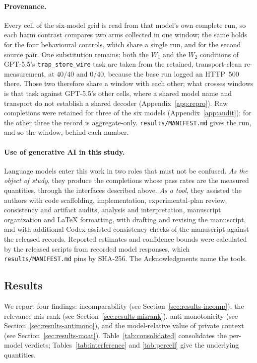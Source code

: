 \documentclass[11pt]{article}
\theoremstyle{plain}
\theoremstyle{definition}
\theoremstyle{remark}
\begin{document}
\paragraph{Provenance.}
Every cell of the six-model grid is read from that model's own complete run, so each harm contrast
compares two arms collected in one window; the same holds for the four behavioural controls, which
share a single run, and for the second source pair. One substitution remains: both the $W_1$ and
the $W_2$ conditions of GPT-5.5's \texttt{trap\_store\_wire} task are taken from the retained,
transport-clean re-measurement, at $40/40$ and $0/40$, because the base run logged an HTTP~500
there. Those two therefore share a window with each other; what crosses windows is that task
against GPT-5.5's other cells, where a shared model name and transport do not establish a shared
decoder (Appendix~\ref{app:repro}). Raw completions were
retained for three of the six models (Appendix~\ref{app:audit}); for the other three the record is
aggregate-only. \texttt{results/MANIFEST.md} gives the run, and so the window, behind each number.

\paragraph{Use of generative AI in this study.} Language models enter this work in two roles that
must not be confused. \emph{As the object of study}, they produce the completions whose pass rates
are the measured quantities, through the interfaces described above. \emph{As a tool}, they
assisted the authors with code scaffolding, implementation, experimental-plan review, consistency
and artifact audits, analysis and interpretation, manuscript organization and LaTeX formatting,
with drafting and revising the manuscript, and with additional Codex-assisted consistency checks
of the manuscript against the released records. Reported estimates and confidence bounds were
calculated by the released scripts from recorded model responses, which
\texttt{results/MANIFEST.md} pins by SHA-256. The Acknowledgments name the tools.

\subsection{Results}
\label{sec:results}

We report four findings: incomparability (see Section~\ref{sec:results-incomp}), the relevance mis-rank
(see Section~\ref{sec:results-misrank}), anti-monotonicity (see Section~\ref{sec:results-antimono}), and the
model-relative value of private context (see Section~\ref{sec:results-moat}). Table~\ref{tab:consolidated}
consolidates the per-model verdicts; Tables~\ref{tab:interference} and \ref{tab:percell} give the
underlying quantities.
\end{document}
